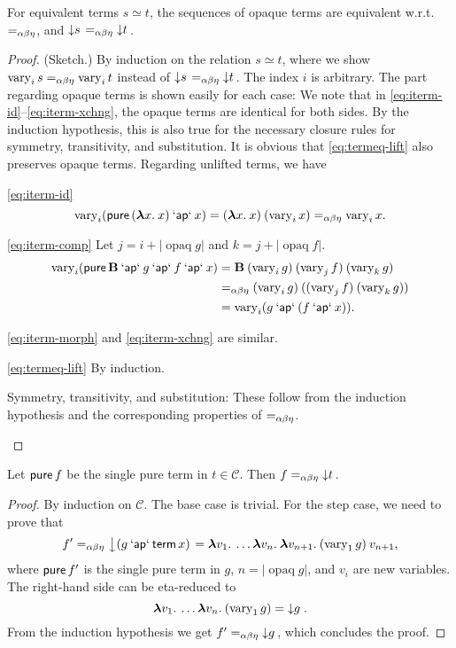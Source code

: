 \begin{lemma}\label{thm:unlift-equiv}
For equivalent terms $s \simeq t$, the sequences of opaque terms are equivalent
w.r.t. $=_{\alpha\beta\eta}$, and $\left\downarrow s\right. =_{\alpha\beta\eta} \left\downarrow t\right.$.
\end{lemma}
\begin{proof} (Sketch.)
By induction on the relation $s \simeq t$, where we show
$\operatorname{vary}_i s =_{\alpha\beta\eta} \operatorname{vary}_i t$ instead of
$\left\downarrow s\right. =_{\alpha\beta\eta} \left\downarrow t\right.$.
The index $i$ is arbitrary.
The part regarding opaque terms is shown easily for each case:
We note that in \eqref{eq:iterm-id}--\eqref{eq:iterm-xchng}, the opaque terms
are identical for both sides.
By the induction hypothesis, this is also true for the necessary closure rules
for symmetry, transitivity, and substitution.
It is obvious that \eqref{eq:termeq-lift} also preserves opaque terms.
Regarding unlifted terms, we have
\begin{prfcases}
\item \eqref{eq:iterm-id}
	\[ \operatorname{vary}_i (\operatorname{\mathsf{pure}}{({\boldsymbol\lambda} x.\>x)} \mathbin{\mathsf{`ap`}} x) =
		({\boldsymbol\lambda} x.\>x) \> (\operatorname{vary}_i x) =_{\alpha\beta\eta} \operatorname{vary}_i x. \]
\item \eqref{eq:iterm-comp}
	Let $j = i + |\operatorname{opaq} g|$ and $k = j + |\operatorname{opaq} f|$.
	\begin{align*}
		\operatorname{vary}_i (\operatorname{\mathsf{pure}} \mathbf{B} \mathbin{\mathsf{`ap`}} g \mathbin{\mathsf{`ap`}} f \mathbin{\mathsf{`ap`}} x) &=
		\mathbf{B} \> (\operatorname{vary}_i g) \> (\operatorname{vary}_j f) \> (\operatorname{vary}_k g) \\
		&=_{\alpha\beta\eta} (\operatorname{vary}_i g) \> ((\operatorname{vary}_j f) \> (\operatorname{vary}_k g)) \\
		&= \operatorname{vary}_i (g \mathbin{\mathsf{`ap`}} (f \mathbin{\mathsf{`ap`}} x)).
	\end{align*}
\item \eqref{eq:iterm-morph} and \eqref{eq:iterm-xchng} are similar.
\item \eqref{eq:termeq-lift} By induction.
\item Symmetry, transitivity, and substitution: These follow from the induction
	hypothesis and the corresponding properties of $=_{\alpha\beta\eta}$.
\end{prfcases}
\end{proof}

\begin{lemma}\label{thm:unlift-head}
Let $\operatorname{\mathsf{pure}} f$ be the single pure term in $t \in \mathcal{C}$.
Then $f =_{\alpha\beta\eta} \left\downarrow t\right.$.
\end{lemma}
\begin{proof}
By induction on $\mathcal{C}$.
The base case is trivial.
For the step case, we need to prove that
\[ f' =_{\alpha\beta\eta} \left\downarrow (g \mathbin{\mathsf{`ap`}} \operatorname{\mathsf{term}} x)\right. =
	{\boldsymbol\lambda} v_1.\>\dots {\boldsymbol\lambda} v_n.\>{\boldsymbol\lambda} v_{n+1}.\>(\operatorname{vary}_1 g) \> v_{n+1}, \]
where $\operatorname{\mathsf{pure}} f'$ is the single pure term in $g$, $n = |\operatorname{opaq} g|$,
and $v_i$ are new variables.
The right-hand side can be eta-reduced to
\[ {\boldsymbol\lambda} v_1.\>\dots {\boldsymbol\lambda} v_n.\>(\operatorname{vary}_1 g) = \left\downarrow g\right.. \]
From the induction hypothesis we get $f' =_{\alpha\beta\eta} \left\downarrow g\right.$, which
concludes the proof.
\end{proof}

